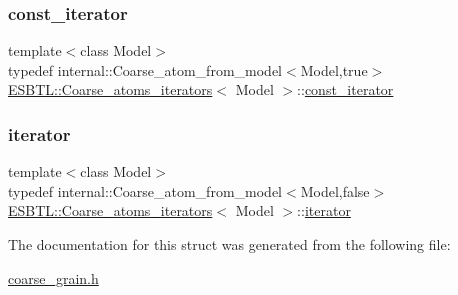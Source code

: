 \subsubsection{\texorpdfstring{const\+\_\+iterator}{const\_iterator}}
{\footnotesize\ttfamily template$<$class Model$>$ \\
typedef internal\+::\+Coarse\+\_\+atom\+\_\+from\+\_\+model$<$Model,true$>$ \hyperlink{structESBTL_1_1Coarse__atoms__iterators}{E\+S\+B\+T\+L\+::\+Coarse\+\_\+atoms\+\_\+iterators}$<$ Model $>$\+::\hyperlink{structESBTL_1_1Coarse__atoms__iterators_acff1d0d843ccc6f72f18fa24b1b016db}{const\+\_\+iterator}}

\mbox{\label{structESBTL_1_1Coarse__atoms__iterators_adfb6d7bbe918849df2d701becde2c8d5}} 
\subsubsection{\texorpdfstring{iterator}{iterator}}
{\footnotesize\ttfamily template$<$class Model$>$ \\
typedef internal\+::\+Coarse\+\_\+atom\+\_\+from\+\_\+model$<$Model,false$>$ \hyperlink{structESBTL_1_1Coarse__atoms__iterators}{E\+S\+B\+T\+L\+::\+Coarse\+\_\+atoms\+\_\+iterators}$<$ Model $>$\+::\hyperlink{structESBTL_1_1Coarse__atoms__iterators_adfb6d7bbe918849df2d701becde2c8d5}{iterator}}



The documentation for this struct was generated from the following file\+:\begin{DoxyCompactItemize}
\item 
\hyperlink{coarse__grain_8h}{coarse\+\_\+grain.\+h}\end{DoxyCompactItemize}
